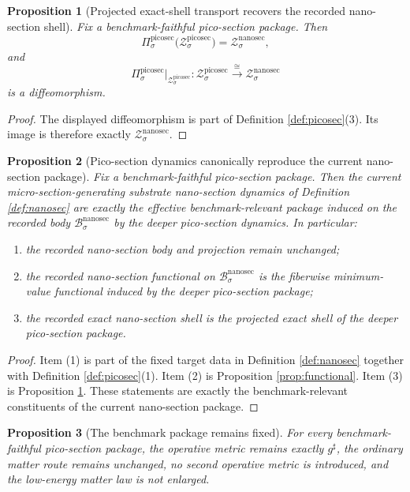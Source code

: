 \documentclass[11pt]{article}
\newcommand{\CompletedMetric}{g^{\sharp}}
\newcommand{\NanoSectionBody}[1]{\mathcal B_{#1}^{\mathrm{nanosec}}}
\newcommand{\NanoSectionShell}[1]{\mathcal Z_{#1}^{\mathrm{nanosec}}}
\newcommand{\PicoSectionProj}[1]{\Pi_{#1}^{\mathrm{picosec}}}
\newcommand{\PicoSectionShell}[1]{\mathcal Z_{#1}^{\mathrm{picosec}}}
\newtheorem{proposition}{Proposition}
\begin{document}
\begin{proposition}[Projected exact-shell transport recovers the recorded nano-section shell]
\label{prop:shell}
Fix a benchmark-faithful pico-section package. Then
\[
\PicoSectionProj{\sigma}\bigl(\PicoSectionShell{\sigma}\bigr)
=
\NanoSectionShell{\sigma},
\]
and
\[
\PicoSectionProj{\sigma}\big|_{\PicoSectionShell{\sigma}}
:
\PicoSectionShell{\sigma}\xrightarrow{\cong}\NanoSectionShell{\sigma}
\]
is a diffeomorphism.
\end{proposition}

\begin{proof}
The displayed diffeomorphism is part of Definition \ref{def:picosec}(3). Its image is therefore exactly \(\NanoSectionShell{\sigma}\).
\end{proof}

\begin{proposition}[Pico-section dynamics canonically reproduce the current nano-section package]
\label{prop:package}
Fix a benchmark-faithful pico-section package. Then the current micro-section-generating substrate nano-section dynamics of Definition \ref{def:nanosec} are exactly the effective benchmark-relevant package induced on the recorded body \(\NanoSectionBody{\sigma}\) by the deeper pico-section dynamics. In particular:
\begin{enumerate}
    \item the recorded nano-section body and projection remain unchanged;
    \item the recorded nano-section functional on \(\NanoSectionBody{\sigma}\) is the fiberwise minimum-value functional induced by the deeper pico-section package;
    \item the recorded exact nano-section shell is the projected exact shell of the deeper pico-section package.
\end{enumerate}
\end{proposition}

\begin{proof}
Item (1) is part of the fixed target data in Definition \ref{def:nanosec} together with Definition \ref{def:picosec}(1). Item (2) is Proposition \ref{prop:functional}. Item (3) is Proposition \ref{prop:shell}. These statements are exactly the benchmark-relevant constituents of the current nano-section package.
\end{proof}

\begin{proposition}[The benchmark package remains fixed]
\label{prop:boundary}
For every benchmark-faithful pico-section package, the operative metric remains exactly \(\CompletedMetric\), the ordinary matter route remains unchanged, no second operative metric is introduced, and the low-energy matter law is not enlarged.
\end{proposition}
\end{document}

